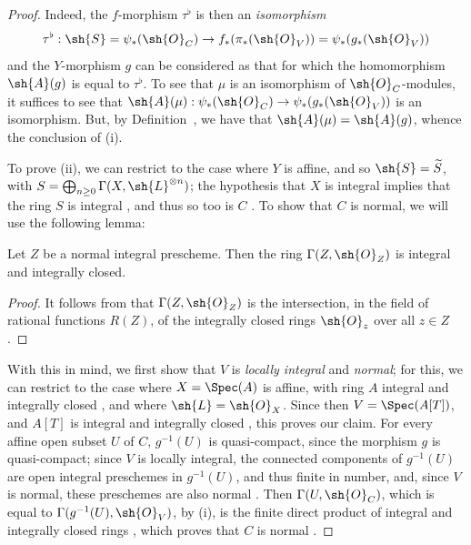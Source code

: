 \begin{proof}
Indeed, the $f$-morphism $\tau^\flat$ is then an \emph{isomorphism}
\[
  \tau^\flat:\sh{S}=\psi_*(\sh{O}_C)\to f_*(\pi_*(\sh{O}_V))=\psi_*(g_*(\sh{O}_V))
\]
and the $Y$-morphism $g$ can be considered as that for which the homomorphism $\sh{A}(g)$  is equal to $\tau^\flat$.
To see that $\mu$ is an isomorphism of $\sh{O}_C$-modules, it suffices  to see that $\sh{A}(\mu):\psi_*(\sh{O}_C)\to\psi_*(g_*(\sh{O}_V))$ is an isomorphism.
But, by Definition~, we have that $\sh{A}(\mu)=\sh{A}(g)$, whence the conclusion of (i).

To prove (ii), we can restrict to the case where $Y$ is affine, and so $\sh{S}=\widetilde{S}$, with
$S=\bigoplus_{n\geq0}\Gamma(X,\sh{L}^{\otimes n})$;
the hypothesis that $X$ is integral implies that the ring $S$ is integral , and thus so too is $C$ .
To show that $C$ is normal, we will use the following lemma:

\begin{lemma}[8.8.6.1]
\label{II.8.8.6.1}
Let $Z$ be a normal integral prescheme.
Then the ring $\Gamma(Z,\sh{O}_Z)$ is integral and integrally closed.
\end{lemma}

\begin{proof}
It follows from  that $\Gamma(Z,\sh{O}_Z)$ is the intersection, in the field of rational functions $R(Z)$, of the integrally closed rings $\sh{O}_z$ over all $z\in Z$.
\end{proof}

With this in mind, we first show that $V$ is \emph{locally integral} and \emph{normal};
for this, we can restrict to the case where $X=\Spec(A)$ is affine, with ring $A$ integral and integrally closed , and where $\sh{L}=\sh{O}_X$.
Since then $V=\Spec(A[T])$, and $A[T]$ is integral and integrally closed \cite[p.~99]{II-24}, this proves our claim.
For every affine open subset $U$ of $C$, $g^{-1}(U)$ is quasi-compact, since the morphism $g$ is quasi-compact;
since $V$ is locally integral, the connected components of $g^{-1}(U)$ are open integral preschemes in $g^{-1}(U)$, and thus finite in number, and, since $V$ is normal, these preschemes are also normal .
Then $\Gamma(U,\sh{O}_C)$, which is equal to $\Gamma(g^{-1}(U),\sh{O}_V)$, by (i), is the finite direct product of integral and integrally closed rings , which proves that $C$ is normal .
\end{proof}


